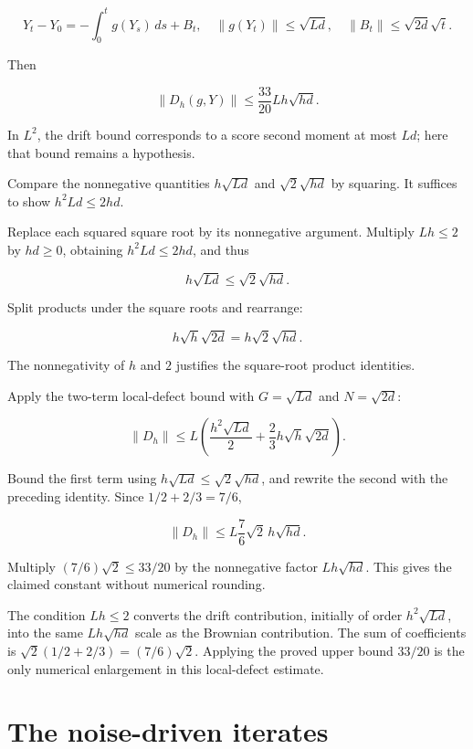 \documentclass[11pt,a4paper]{report}
\begin{document}
\[Y_t-Y_0=-\int_0^t g(Y_s)\,ds+B_t,\quad \|g(Y_t)\|\le\sqrt{Ld},\quad \|B_t\|\le\sqrt{2d}\sqrt t.\]

Then

\[\boxed{\|D_h(g,Y)\|\le\frac{33}{20}Lh\sqrt{hd}.}\]

In \(L^2\), the drift bound corresponds to a score second moment at most \(Ld\); here that bound remains a hypothesis.



Compare the nonnegative quantities \(h\sqrt{Ld}\) and \(\sqrt2\sqrt{hd}\) by squaring. It suffices to show \(h^2Ld\le2hd\).



Replace each squared square root by its nonnegative argument. Multiply \(Lh\le2\) by \(hd\ge0\), obtaining \(h^2Ld\le2hd\), and thus

\[h\sqrt{Ld}\le\sqrt2\sqrt{hd}.\]

Split products under the square roots and rearrange:

\[h\sqrt h\sqrt{2d}=h\sqrt2\sqrt{hd}.\]

The nonnegativity of \(h\) and \(2\) justifies the square-root product identities.



Apply the two-term local-defect bound with \(G=\sqrt{Ld}\) and \(N=\sqrt{2d}\):

\[\|D_h\|\le L\left(\frac{h^2\sqrt{Ld}}2+\frac23h\sqrt h\sqrt{2d}\right).\]

Bound the first term using \(h\sqrt{Ld}\le\sqrt2\sqrt{hd}\), and rewrite the second with the preceding identity. Since \(1/2+2/3=7/6\),

\[\|D_h\|\le L\frac76\sqrt2\,h\sqrt{hd}.\]

Multiply \((7/6)\sqrt2\le33/20\) by the nonnegative factor \(Lh\sqrt{hd}\). This gives the claimed constant without numerical rounding.



The condition \(Lh\le2\) converts the drift contribution, initially of order \(h^2\sqrt{Ld}\), into the same \(Lh\sqrt{hd}\) scale as the Brownian contribution. The sum of coefficients is \(\sqrt2(1/2+2/3)=(7/6)\sqrt2\). Applying the proved upper bound \(33/20\) is the only numerical enlargement in this local-defect estimate.

\section{\texorpdfstring{The noise-driven iterates}{The noise-driven iterates}}
\label{proof-module-UnadjustedLangevin-Dynamics-lean}
\end{document}
